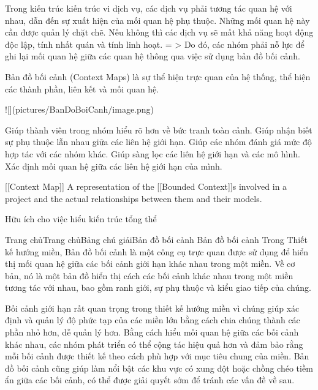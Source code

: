 Trong kiến trúc kiến trúc vi dịch vụ, các dịch vụ phải tương tác quan hệ với nhau, dẫn đến sự xuất hiện của mối quan hệ phụ thuộc. Những mối quan hệ này cần được quản lý chặt chẽ. Nếu không thì các dịch vụ sẽ mất khả năng hoạt động độc lập, tính nhất quán và tính linh hoạt.
= > Do đó, các nhóm phải nỗ lực để ghi lại mối quan hệ giữa các quan hệ thông qua việc sử dụng bản đồ bối cảnh.

Bản đồ bối cảnh (Context Maps) là sự thể hiện trực quan của hệ thống, thể hiện các thành phần, liên kết và mối quan hệ.

![](pictures/BanDoBoiCanh/image.png)


Giúp thành viên trong nhóm hiểu rõ hơn về bức tranh toàn cảnh.
Giúp nhận biết sự phụ thuộc lẫn nhau giữa các liên hệ giới hạn.
Giúp các nhóm đánh giá mức độ hợp tác với các nhóm khác.
Giúp sàng lọc các liên hệ giới hạn và các mô hình.
Xác định mối quan hệ giữa các liên hệ giới hạn của mình.

[[Context Map]] A representation of the [[Bounded Context]]s involved in a project and the actual relationships between them and their models.

Hữu ích cho việc hiểu kiến trúc tổng thể


Trang chủTrang chủBảng chú giảiBản đồ bối cảnh
Bản đồ bối cảnh
Trong Thiết kế hướng miền, Bản đồ bối cảnh là một công cụ trực quan được sử dụng để hiển thị mối quan hệ giữa các bối cảnh giới hạn khác nhau trong một miền. Về cơ bản, nó là một bản đồ hiển thị cách các bối cảnh khác nhau trong một miền tương tác với nhau, bao gồm ranh giới, sự phụ thuộc và kiểu giao tiếp của chúng.

Bối cảnh giới hạn rất quan trọng trong thiết kế hướng miền vì chúng giúp xác định và quản lý độ phức tạp của các miền lớn bằng cách chia chúng thành các phần nhỏ hơn, dễ quản lý hơn. Bằng cách hiểu mối quan hệ giữa các bối cảnh khác nhau, các nhóm phát triển có thể cộng tác hiệu quả hơn và đảm bảo rằng mỗi bối cảnh được thiết kế theo cách phù hợp với mục tiêu chung của miền. Bản đồ bối cảnh cũng giúp làm nổi bật các khu vực có xung đột hoặc chồng chéo tiềm ẩn giữa các bối cảnh, có thể được giải quyết sớm để tránh các vấn đề về sau.

